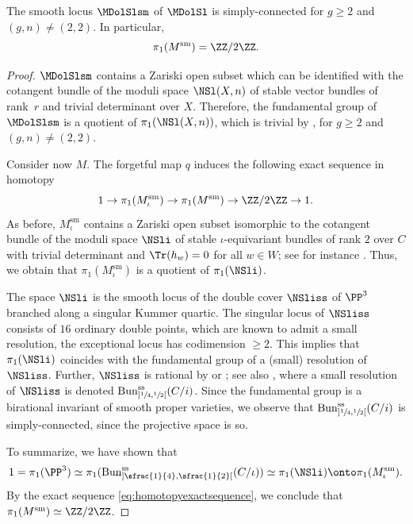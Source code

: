 \begin{prop}\label{lem:fundamentalgroupsmoothlocus}
The smooth locus $\MDolSlsm$ of $\MDolSl$ is simply-connected for $g \geq 2$ and $(g,n)\neq (2,2)$. In particular,
\[
\pi_1 (M^{\mathrm{sm}})=\ZZ/2\ZZ.
\]
\end{prop}
\begin{proof} $\MDolSlsm$ contains a Zariski open subset which can be identified with the cotangent bundle of the moduli space $\NSl(X,n)$ of stable vector bundles of rank~$r$ and trivial determinant over $X$.
Therefore, the fundamental group of $\MDolSlsm$ is a quotient of $\pi_1(\NSl(X,n))$, which is trivial by \cite[Th.\,3.2(i)]{DaskalopoulosUhlenbeck1995}, for $g \geq 2$ and $(g,n)\neq (2,2)$.

Consider now $M$. The forgetful map $q$ induces the following exact sequence in homotopy
\begin{equation}\label{eq:homotopyexactsequence}
1 \to \pi_1(M^{\mathrm{sm}}_{\iota}) \to \pi_1(M^{\mathrm{sm}}) \to \ZZ/2\ZZ \to 1.
\end{equation}
As before, $M^{\mathrm{sm}}_{\iota}$ contains a Zariski open subset isomorphic to the cotangent bundle of the moduli space $\NSli$ of stable $\iota$-equivariant bundles of rank $2$ over $C$ with trivial determinant and $\Tr(h_{w})=0$ for all $w \in W$; see for instance \cite[Chap.\,6,\,p.\,73]{HeuLoray19}. Thus, we obtain that
$\pi_1(M^{\mathrm{sm}}_{\iota})$ is a quotient of $\pi_1(\NSli)$.

The space $\NSli$ is the smooth locus of the double cover $\NSliss$ of $\PP^3$ branched along a singular Kummer quartic. The singular locus of $\NSliss$ consists of $16$ ordinary double points, which are known to admit a small resolution, \ie the exceptional locus has codimension $\geq 2$. This implies that $\pi_1(\NSli)$ coincides with the fundamental group of a (small) resolution of $\NSliss$. Further, $\NSliss$ is rational by \cite[Th.\,2.2]{Kumar00} or \cite[Th.\,1.3]{CPC19}; see also \cite[\S 5.4.2 \& \S 5.5]{HeuLoray19}, where a small resolution of $\NSliss$ is denoted $\operatorname{Bun}^\mathrm{ss}_{]\sfrac{1}{4}, \sfrac{1}{2}[}(C/i)$. Since the fundamental group is a birational invariant of smooth proper varieties, we observe that $\operatorname{Bun}^\mathrm{ss}_{]\sfrac{1}{4}, \sfrac{1}{2}[}(C/i)$ is simply-connected, since the projective space is so.

To summarize, we have shown that
\[
1= \pi_1(\PP^3)\simeq \pi_1(\operatorname{Bun}^\mathrm{ss}_{]\sfrac{1}{4}, \sfrac{1}{2}[}(C/\iota)) \simeq \pi_1(\NSli) \onto \pi_1(M^{\mathrm{sm}}_{\iota}).
\]
By the exact sequence \eqref{eq:homotopyexactsequence}, we conclude that $\pi_1(M^{\mathrm{sm}}) \simeq \ZZ/2\ZZ$.
\end{proof}


